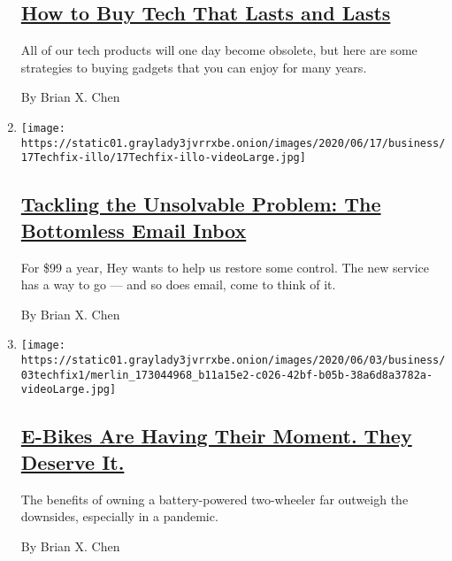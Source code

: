 \begin{enumerate}
  \hypertarget{how-to-buy-tech-that-lasts-and-lasts}{%
  \subsection{\texorpdfstring{\href{/2020/07/08/technology/personaltech/tech-that-lasts.html}{How
  to Buy Tech That Lasts and
  Lasts}}{How to Buy Tech That Lasts and Lasts}}\label{how-to-buy-tech-that-lasts-and-lasts}}

  All of our tech products will one day become obsolete, but here are
  some strategies to buying gadgets that you can enjoy for many years.

  By Brian X. Chen
\item
  \texttt{[image: https://static01.graylady3jvrrxbe.onion/images/2020/06/17/business/17Techfix-illo/17Techfix-illo-videoLarge.jpg]}

  \hypertarget{tackling-the-unsolvable-problem-the-bottomless-email-inbox}{%
  \subsection{\texorpdfstring{\href{/2020/06/17/technology/personaltech/hey-email-service-screening.html}{Tackling
  the Unsolvable Problem: The Bottomless Email
  Inbox}}{Tackling the Unsolvable Problem: The Bottomless Email Inbox}}\label{tackling-the-unsolvable-problem-the-bottomless-email-inbox}}

  For \$99 a year, Hey wants to help us restore some control. The new
  service has a way to go --- and so does email, come to think of it.

  By Brian X. Chen
\item
  \texttt{[image: https://static01.graylady3jvrrxbe.onion/images/2020/06/03/business/03techfix1/merlin\_173044968\_b11a15e2-c026-42bf-b05b-38a6d8a3782a-videoLarge.jpg]}

  \hypertarget{e-bikes-are-having-their-moment-they-deserve-it}{%
  \subsection{\texorpdfstring{\href{/2020/06/03/technology/personaltech/e-bikes-are-having-their-moment-they-deserve-it.html}{E-Bikes
  Are Having Their Moment. They Deserve
  It.}}{E-Bikes Are Having Their Moment. They Deserve It.}}\label{e-bikes-are-having-their-moment-they-deserve-it}}

  The benefits of owning a battery-powered two-wheeler far outweigh the
  downsides, especially in a pandemic.

  By Brian X. Chen
\end{enumerate}

